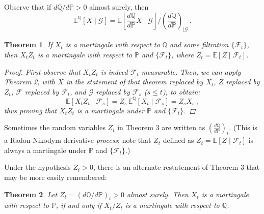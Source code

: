 \documentclass[12pt]{article}
\newtheorem{thm}{Theorem}
\newcommand{\PP}{\mathbb{P}}
\newcommand{\E}{\mathbb{E}}
\newcommand{\EQ}{\mathbb{E}^\mathbb{Q}}
\newcommand{\PQ}{\mathbb{Q}}
\newcommand{\sF}{\mathcal{F}}
\newcommand{\sG}{\mathcal{G}}
\begin{document}
Observe that if $d \PQ / d \PP > 0$ almost surely,
then
\[
\EQ[X \mid \sG] = \E\left [ \frac{d\PQ}{d\PP} X \mid \sG \right]
\Big/ \left( \frac{d\PQ}{d\PP} \right)_{\mid \sG}\,.
\]

\begin{thm}
If $X_t$ is a martingale with respect to $\PQ$ and some
filtration $\{ \sF_t \}$,
then $X_t Z_t$ is a martingale with respect to $\PP$ and $\{ \sF_t\}$,
where $Z_t = \E [ Z \mid \sF_t]$.

\begin{proof}
First observe that $X_t Z_t$ is indeed $\sF_t$-measurable.
Then, we can apply Theorem 2,
with $X$ in the statement of that theorem replaced by
$X_t$, 
$Z$ replaced by $Z_t$, 
$\sF$ replaced by $\sF_t$, and $\sG$ replaced by $\sF_s$ ($s \leq t$),
to obtain:
\[
\E[ X_t Z_t \mid \sF_s ] = Z_s \, \EQ[ X_t \mid \sF_s]
= Z_s X_s\,,
\]
thus proving that $X_t Z_t$ is a martingale under $\PP$
and $\{ \sF_t \}$.
\end{proof}
\end{thm}

Sometimes the random variables $Z_t$ in Theorem 3
are written as $\left( \frac{d\PQ}{d\PP} \right)_t$.
(This is a Radon-Nikodym derivative \emph{process};
note that $Z_t$ defined as $Z_t = \E[Z \mid \sF_t]$
 is always a martingale
under $\PP$ and $\{ \sF_t \}$.)

Under the hypothesis $Z_t > 0$, 
there is an alternate restatement of Theorem 3
that may be more easily remembered:

\begin{thm}
Let $Z_t = ( d\PQ / d\PP )_t > 0$ almost surely.
Then $X_t$ is a martingale with respect to $\PP$,
if and only if $X_t / Z_t$ is a martingale with respect to $\PQ$.
\end{thm}

\end{document}

